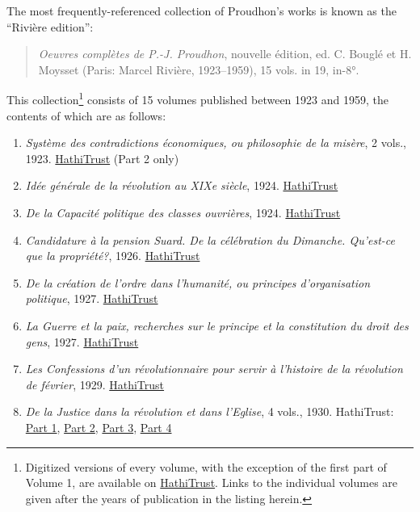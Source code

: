 The most frequently-referenced collection of Proudhon's works is known as the ``Rivière edition'':
\begin{quote}
    \textit{Oeuvres complètes de P.-J. Proudhon}, nouvelle édition, ed. C. Bouglé et H. Moysset (Paris: Marcel Rivière, 1923--1959), 15 vols. in 19, in-8°.
\end{quote}
This collection\footnote{Digitized versions of every volume, with the exception of the first part of Volume 1, are available on \href{https://catalog.hathitrust.org/Record/010062933}{HathiTrust}. Links to the individual volumes are given after the years of publication in the listing herein.} consists of 15 volumes published between 1923 and 1959, the contents of which are as follows:
\begin{enumerate}
    \item \textit{Système des contradictions économiques, ou philosophie de la misère}, 2 vols., 1923. \href{https://hdl.handle.net/2027/uc1.b4149255}{HathiTrust} (Part 2 only)
    
    \item \textit{Idée générale de la révolution au XIXe siècle}, 1924. \href{https://hdl.handle.net/2027/uc1.b4149256}{HathiTrust}
    
    \item \textit{De la Capacité politique des classes ouvrières}, 1924. \href{https://hdl.handle.net/2027/uc1.b4149257}{HathiTrust}
    
    \item \textit{Candidature à la pension Suard. De la célébration du Dimanche. Qu'est-ce que la propriété?}, 1926. \href{https://hdl.handle.net/2027/uc1.b4149258}{HathiTrust}
    
    \item \textit{De la création de l'ordre dans l'humanité, ou principes d'organisation politique}, 1927. \href{https://hdl.handle.net/2027/uc1.b4149259}{HathiTrust}
    
    \item \textit{La Guerre et la paix, recherches sur le principe et la constitution du droit des gens}, 1927. \href{https://hdl.handle.net/2027/uc1.b4149260}{HathiTrust}
    
    \item \textit{Les Confessions d'un révolutionnaire pour servir à l'histoire de la révolution de février}, 1929. \href{https://hdl.handle.net/2027/uc1.b4149261}{HathiTrust}
    
    \item \textit{De la Justice dans la révolution et dans l'Eglise}, 4 vols., 1930. HathiTrust: \href{https://hdl.handle.net/2027/uc1.b4149262}{Part 1}, \href{https://hdl.handle.net/2027/uc1.b4149263}{Part 2}, \href{https://hdl.handle.net/2027/uc1.b4149264}{Part 3}, \href{https://hdl.handle.net/2027/uc1.b4149265}{Part 4}
    

\end{enumerate}
